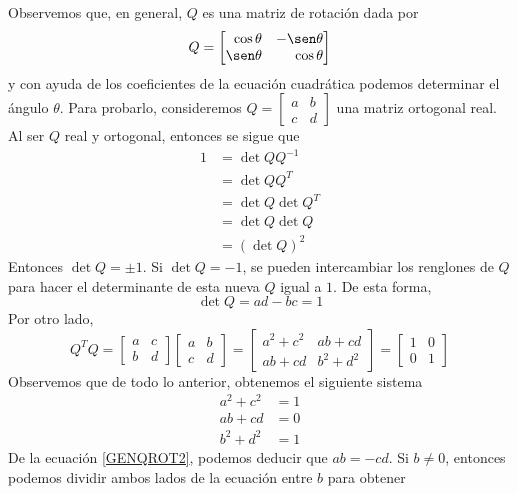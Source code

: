 Observemos que, en general, $Q$ es una matriz de rotación dada por
$$Q = \begin{bmatrix*}[r]
    \cos \theta & - \sen \theta \\
    \sen \theta & \cos \theta
\end{bmatrix*}$$
y con ayuda de los coeficientes de la ecuación cuadrática podemos determinar el ángulo $\theta$. Para probarlo, consideremos $Q = \begin{bmatrix}
    a & b \\
    c & d
\end{bmatrix}$ una matriz ortogonal real. Al ser $Q$ real y ortogonal, entonces se sigue que
\begin{align*}
    1 & = \operatorname{det} QQ^{-1} \\
    & = \operatorname{det} QQ^T \\
    & = \operatorname{det} Q \operatorname{det} Q^T \\
    & = \operatorname{det} Q \operatorname{det} Q \\
    & = (\operatorname{det} Q)^2
\end{align*}
Entonces $\operatorname{det} Q = \pm 1$. Si $\operatorname{det} Q = - 1$, se pueden intercambiar los renglones de $Q$ para hacer el determinante de esta nueva $Q$ igual a $1$. De esta forma,
$$\operatorname{det} Q = ad - bc = 1$$
Por otro lado,
$$Q^TQ = \begin{bmatrix}
    a & c \\
    b & d
\end{bmatrix} \begin{bmatrix}
    a & b \\
    c & d
\end{bmatrix} = \begin{bmatrix}
    a^2 + c^2 & ab + cd \\
    ab + cd & b^2 + d^2
\end{bmatrix} = \begin{bmatrix}
    1 & 0 \\
    0 & 1
\end{bmatrix}$$
Observemos que de todo lo anterior, obtenemos el siguiente sistema
\begin{align}
    a^2 + c^2 & = 1 \label{GENQROT1} \\
    ab + cd & = 0 \label{GENQROT2} \\
    b^2 + d^2 & = 1 \label{GENQROT3}
\end{align}
De la ecuación \eqref{GENQROT2}, podemos deducir que $ab = -cd$. Si $b \neq 0$, entonces podemos dividir ambos lados de la ecuación entre $b$ para obtener
